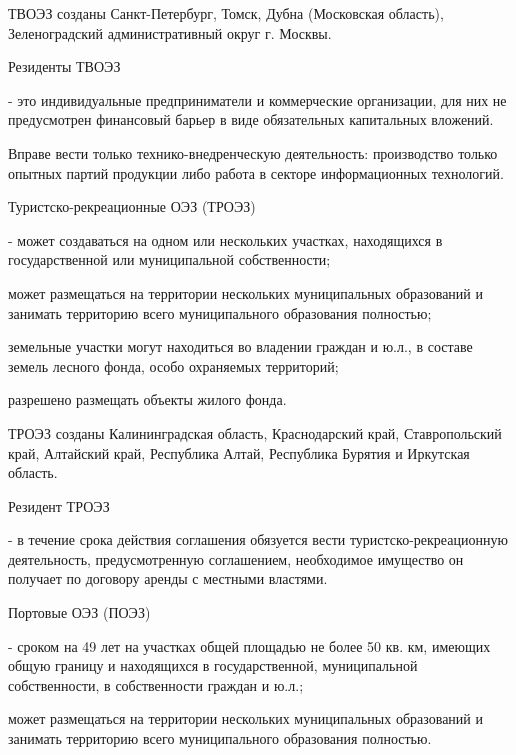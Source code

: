 \documentclass[_Venture_p3.tex]{subfiles}
\begin{document}
\begin{frame}{ТВОЭЗ созданы}
Санкт-Петербург, Томск, Дубна (Московская область), Зеленоградский административный округ г. Москвы.
\end{frame}

\begin{frame}{Резиденты ТВОЭЗ}
\begin{block}{}
	\quad
	- это индивидуальные предприниматели и коммерческие организации, для них не предусмотрен финансовый барьер в виде обязательных капитальных вложений.
\end{block}
Вправе вести только технико-внедренческую деятельность: производство только опытных партий продукции либо работа в секторе информационных технологий.
\end{frame}




\begin{frame}{Туристско-рекреационные ОЭЗ (ТРОЭЗ)}
\begin{block}{}
	\quad
	- может создаваться на одном или нескольких участках, находящихся в государственной или муниципальной собственности;
	
	может размещаться на территории нескольких муниципальных образований и занимать территорию всего муниципального образования полностью;
	
	земельные участки могут находиться во владении граждан и ю.л., в составе земель лесного фонда, особо охраняемых территорий;
	
	разрешено размещать объекты жилого фонда.
\end{block}
\end{frame}

\begin{frame}{ТРОЭЗ созданы}
Калининградская область, Краснодарский край, Ставропольский край, Алтайский край, Республика Алтай, Республика Бурятия и Иркутская область.
\end{frame}

\begin{frame}{Резидент ТРОЭЗ}
\begin{block}{}
	\quad
	- в течение срока действия соглашения обязуется вести туристско-рекреационную деятельность, предусмотренную соглашением, необходимое имущество он получает по договору аренды с местными властями.
\end{block}
\end{frame}


\begin{frame}{Портовые ОЭЗ (ПОЭЗ)}
\begin{block}{}
	\quad
	- сроком на 49 лет на участках общей площадью не более 50 кв. км, имеющих общую границу и находящихся в государственной, муниципальной собственности, в собственности граждан и ю.л.;
	
	может размещаться на территории нескольких муниципальных образований и занимать территорию всего муниципального образования полностью.	
\end{block}
\end{frame}
\end{document}
